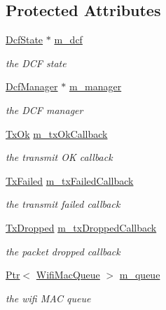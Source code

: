 \subsection*{Protected Attributes}
\begin{DoxyCompactItemize}
\item 
\hyperlink{classns3_1_1DcfState}{Dcf\+State} $\ast$ \hyperlink{classns3_1_1DcaTxop_a16cc1f168ff78aabcf938e42996121c4}{m\+\_\+dcf}
\begin{DoxyCompactList}\small\item\em the D\+CF state \end{DoxyCompactList}\item 
\hyperlink{classns3_1_1DcfManager}{Dcf\+Manager} $\ast$ \hyperlink{classns3_1_1DcaTxop_a7a58a717ab864b5d87e4392c69257dcf}{m\+\_\+manager}
\begin{DoxyCompactList}\small\item\em the D\+CF manager \end{DoxyCompactList}\item 
\hyperlink{classns3_1_1DcaTxop_a773f1ef847db20e0618ab9e7378a3023}{Tx\+Ok} \hyperlink{classns3_1_1DcaTxop_a0d37805f9e520da7a15dee3f66c2bfd5}{m\+\_\+tx\+Ok\+Callback}
\begin{DoxyCompactList}\small\item\em the transmit OK callback \end{DoxyCompactList}\item 
\hyperlink{classns3_1_1DcaTxop_a3ebd4f13afc638a908343e187f9d5514}{Tx\+Failed} \hyperlink{classns3_1_1DcaTxop_a3d58ad498059e9751312a7ee5b364678}{m\+\_\+tx\+Failed\+Callback}
\begin{DoxyCompactList}\small\item\em the transmit failed callback \end{DoxyCompactList}\item 
\hyperlink{classns3_1_1DcaTxop_a38a5d5eb96a8679b8d88d775fddffd86}{Tx\+Dropped} \hyperlink{classns3_1_1DcaTxop_afcbfde214243789777b66de41ccf0088}{m\+\_\+tx\+Dropped\+Callback}
\begin{DoxyCompactList}\small\item\em the packet dropped callback \end{DoxyCompactList}\item 
\hyperlink{classns3_1_1Ptr}{Ptr}$<$ \hyperlink{namespacens3_a3ca96bcdf02c0e7cacea08ca62ead54c}{Wifi\+Mac\+Queue} $>$ \hyperlink{classns3_1_1DcaTxop_a7f42500857237f6f18aee436ef22ef62}{m\+\_\+queue}
\begin{DoxyCompactList}\small\item\em the wifi M\+AC queue \end{DoxyCompactList}\item 

\end{DoxyCompactItemize}
